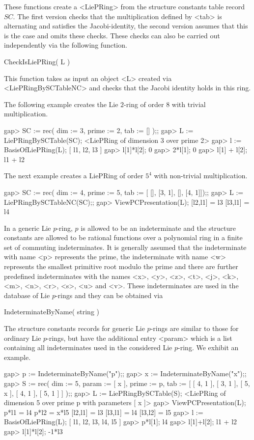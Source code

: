 These functions create a <LiePRing> from the structure constants table
record $SC$. The first version checks that the multiplication defined by
<tab> is alternating and satisfies the Jacobi-identity, the second version
assumes that this is the case and omits these checks. These checks can
also be carried out independently via the following function.

\> CheckIsLiePRing( L )

This function takes as input an object <L> created via <LiePRingBySCTableNC>
and checks that the Jacobi identity holds in this ring.

The following example creates the Lie $2$-ring of order $8$ with trivial 
multiplication.  

\beginexample
gap> SC := rec( dim := 3, prime := 2, tab := [] );;
gap> L := LiePRingBySCTable(SC);
<LiePRing of dimension 3 over prime 2>
gap> l := BasisOfLiePRing(L);
[ l1, l2, l3 ]
gap> l[1]*l[2];
0
gap> 2*l[1];
0
gap> l[1] + l[2];
l1 + l2
\endexample

The next example creates a LiePRing of order $5^4$ with non-trivial 
multiplication.

\beginexample
gap> SC := rec( dim := 4, prime := 5, tab := [ [], [3, 1], [], [4, 1]]);;
gap> L := LiePRingBySCTableNC(SC);;
gap> ViewPCPresentation(L);
[l2,l1] = l3
[l3,l1] = l4
\endexample


In a generic Lie $p$-ring, $p$ is allowed to be an indeterminate and 
the structure constants are allowed to be rational functions over a 
polynomial ring in a finite set of 
commuting indeterminates. It is generally assumed that the indeterminate
with name <p> represents the prime, the indeterminate with name <w> 
represents the smallest primitive root modulo the prime and there are 
further predefined indeterminates with the names <x>, <y>, <z>, <t>, 
<j>, <k>, <m>, <n>, <r>, <s>, <u> and <v>. These indeterminates are used 
in the database of Lie $p$-rings and they can be obtained via

\> IndeterminateByName( string )

The structure constants records for generic Lie $p$-rings are similar to
those for ordinary Lie $p$-rings, but have the additional entry <param>
which is a list containing all indeterminates used in the considered Lie
$p$-ring. We exhibit an example.

\beginexample
gap> p := IndeterminateByName("p");;
gap> x := IndeterminateByName("x");;
gap> S := rec( dim := 5, 
               param := [ x ], 
               prime := p, 
               tab := [ [ 4, 1 ], [ 3, 1 ], [ 5, x ], [ 4, 1 ], [ 5, 1 ] ] );;
gap> L := LiePRingBySCTable(S);
<LiePRing of dimension 5 over prime p with parameters [ x ]>
gap> ViewPCPresentation(L);
p*l1 = l4
p*l2 = x*l5
[l2,l1] = l3
[l3,l1] = l4
[l3,l2] = l5
gap> l := BasisOfLiePRing(L);
[ l1, l2, l3, l4, l5 ]
gap> p*l[1];
l4
gap> l[1]+l[2];
l1 + l2
gap> l[1]*l[2];
-1*l3
\endexample

